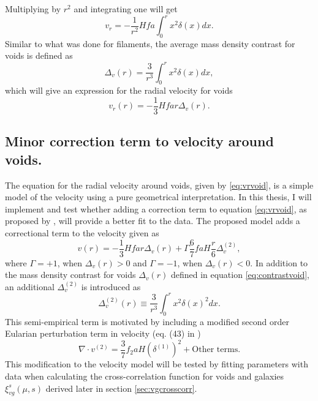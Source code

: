 Multiplying by $r^2$ and integrating one will get
\begin{equation}
    v_r = -\frac{1}{r^2}Hfa\int_0^r x^2\delta(x)dx.
\end{equation}
Similar to what was done for filaments, the average mass density contrast for voids is defined as
\begin{equation}\label{eq:contrastvoid}
    \Delta_v(r)=\frac{3}{r^3}\int_0^r x^2\delta(x)dx,
\end{equation}
which will give an expression for the radial velocity for voids
\begin{equation}\label{eq:vrvoid}
    v_r(r)=-\frac{1}{3}Hfar\Delta_v(r).
\end{equation}
\subsection{Minor correction term to velocity around voids.}\label{sec:vr_correction}
The equation for the radial velocity around voids, given by \ref{eq:vrvoid}, is a simple model of the velocity using a pure geometrical interpretation. In this thesis, I will implement and test whether adding a correction term to equation \ref{eq:vrvoid}, as proposed by \cite{Achitouv_streaming}, will provide a better fit to the data. The proposed model adds a correctional term to the velocity given as
\begin{equation}\label{eq:achitouv2017}
    v(r)=-\frac{1}{3}Hfar\Delta_v(r)+\Gamma\frac{6}{7}faH\frac{r}{6}\Delta_v^{(2)},
\end{equation}
where $\Gamma=+1$, when $\Delta_v(r)>0$ and $\Gamma=-1$, when $\Delta_v(r)<0$. In addition to the mass density contrast for voids $\Delta_v(r)$ defined in equation \ref{eq:contrastvoid}, an additional $\Delta_v^{(2)}$ is introduced as 
\begin{equation}
    \Delta_v^{(2)}(r)\equiv\frac{3}{r^3}\int_0^rx^2\delta(x)^2dx.
\end{equation}
This semi-empirical term is motivated by including a modified second order Eularian perturbation term in velocity (eq. (43) in \cite{Catelan_2ndordervelpert})
\begin{equation}
    \nabla\cdot v^{(2)}=\frac{3}{7}f_2aH(\delta^{(1)})^2+\text{Other terms}.
\end{equation}
This modification to the velocity model will be tested by fitting parameters with data when calculating the cross-correlation function for voids and galaxies $\xi_{vg}^s(\mu,s)$ derived later in section \ref{sec:vgcrosscorr}.
